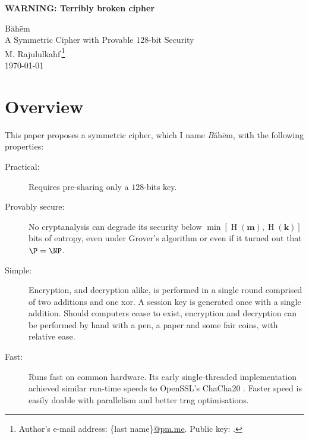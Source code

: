 \documentclass[twocolumn,hidelinks]{article}
\newcommand{\baheem}{Băhēm}
\DeclareMathOperator{\entropy}{H}
\begin{document}
\textbf{\color{red}WARNING:  Terribly broken cipher}

\begin{center}
    \Huge
    \baheem\\
    \LARGE
    A Symmetric Cipher with Provable $128$-bit Security\\
    \normalsize
    \vspace{0.5em}
    M. Rajululkahf\,\footnote{Author's
    e-mail address: \{last name\}\url{@pm.me}.  Public key: .}\\
    \vspace{0.5em}
    \footnotesize
    \today
\end{center}

\section*{Overview}
This paper proposes a symmetric cipher, which I name \emph\baheem, with the
following properties:
\begin{description}
    \item[Practical:]  Requires pre-sharing only a $128$-bits key.

    \item[Provably secure:]  No cryptanalysis can degrade its security
        below $\min[\entropy(\mathbf{m}), \entropy(\mathbf{k})]$ bits of
        entropy, even under Grover's algorithm \cite{10.1145/237814.237866}
        or even if it turned out that $\P = \NP$.

    \item[Simple:]  Encryption, and decryption alike, is performed in a
        single round comprised of two additions and one \gls{xor}.  A
        session key is generated once with a single addition. Should
        computers cease to exist, encryption and decryption can be
        performed by hand with a pen, a paper and some fair coins, with
        relative ease.

    \item[Fast:]  Runs fast on common hardware.  Its early single-threaded
        implementation achieved similar run-time speeds to OpenSSL's
        ChaCha20 \cite{chacha20}. Faster speed is easily doable with
        parallelism and better \gls{trng} optimisations.
\end{description}
\end{document}
